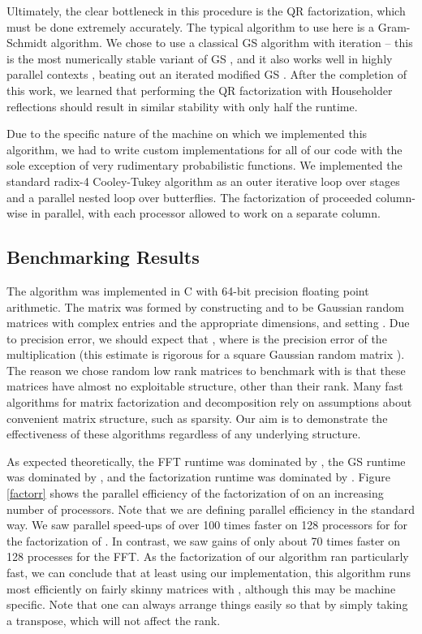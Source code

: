 \documentclass[11pt]{article}
\begin{document}
Ultimately, the clear bottleneck in this procedure is the QR factorization, which must be done extremely accurately.   The typical algorithm to use here is a Gram-Schmidt algorithm.   We chose to use a classical GS algorithm with iteration -- this is the most numerically stable variant of GS \cite{bjorck}, and it also works well in highly parallel contexts \cite{lingen}, beating out an iterated modified GS \cite{hoffman}.    After the completion of this work, we learned that performing the QR factorization with Householder reflections should result in similar stability with only half the runtime.

Due to the specific nature of the machine on which we implemented this algorithm, we had to write custom implementations for all of our code with the sole exception of very rudimentary probabilistic functions.   We implemented the standard radix-4 Cooley-Tukey algorithm as an outer iterative loop over stages and a parallel nested loop over butterflies.     The factorization of  proceeded column-wise in parallel, with each processor allowed to work on a separate column.    
\subsection{Benchmarking Results}
The algorithm was implemented in C with 64-bit precision floating point arithmetic.  The matrix  was formed by constructing  and  to be Gaussian random matrices with complex entries and the appropriate dimensions, and setting .   Due to precision error, we should expect that , where  is the precision error of the multiplication  (this estimate is rigorous for a square Gaussian random matrix \cite{rokyale1}).   The reason we chose random low rank matrices to benchmark with is that these matrices have almost no exploitable structure, other than their rank.  Many fast algorithms for matrix factorization and decomposition rely on assumptions about convenient matrix structure, such as sparsity.   Our aim is to demonstrate the effectiveness of these algorithms regardless of any underlying structure.

As expected theoretically, the FFT runtime was dominated by , the GS runtime was dominated by , and the  factorization runtime was dominated by .  Figure \ref{factorr} shows the parallel efficiency of the factorization of  on an increasing number of processors.  Note that we are defining parallel efficiency in the standard way.
We saw parallel speed-ups of over 100 times faster on 128 processors for  for the factorization of .  In contrast, we saw gains of only about 70 times faster on 128 processes for the FFT.  As the factorization of our algorithm ran particularly fast, we can conclude that at least using our implementation, this algorithm runs most efficiently on fairly skinny matrices with , although this may be machine specific.  Note that one can always arrange things easily so that  by simply taking a transpose, which will not affect the rank.
\end{document}

